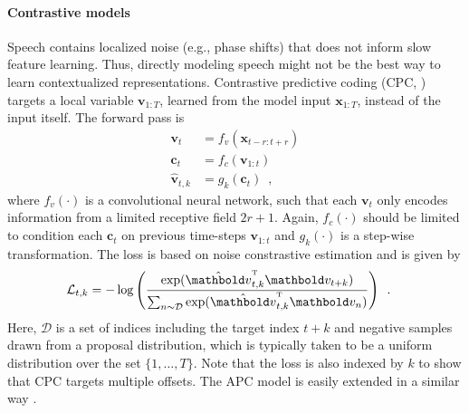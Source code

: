 \paragraph{Contrastive models} Speech contains localized noise (e.g., phase shifts) that does not inform slow feature learning. Thus, directly modeling speech might not be the best way to learn contextualized representations. Contrastive predictive coding (CPC,  \citealp{oord2018representation}) targets a local variable $\mathbf{v}_{1:T}$, learned from the model input $\mathbf{x}_{1:T}$, instead of the input itself. The forward pass is
%
\begin{align}
    \mathbf{v}_{t} &= f_{v}(\mathbf{x}_{t-r:t+r}) \label{eq: cpc local representation} \\
    \mathbf{c}_{t} &= f_{c}(\mathbf{v}_{1:t}) \\
    \hat{\mathbf{v}}_{t,k} &= g_k(\mathbf{c}_{t}) \enspace,
\end{align}
%
\noindent where $f_v(\cdot)$ is a convolutional neural network, such that each $\mathbf{v}_{t}$ only encodes information from a limited receptive field $2r+1$. Again, $f_c(\cdot)$ should be limited to condition each $\mathbf{c}_t$ on previous time-steps $\mathbf{v}_{1:t}$ and $g_k(\cdot)$ is a step-wise transformation. The loss is based on noise constrastive estimation \cite{gutmann2010noise} and is given by
\begin{align}
    \mathcal{L}_{t,k} &= - \log \left(\frac{\exp(\hat{\mathbf{v}}_{t,k}^{\text{\tiny T}}\mathbf{v}_{t+k})}{\sum_{n \sim \mathcal{D}} \exp(\hat{\mathbf{v}}_{t,k}^{\text{\tiny T}}\mathbf{v}_{n})} \right)\enspace .
    \label{eq: cpc loss}
\end{align}
%
\noindent Here, $\mathcal{D}$ is a set of indices including the target index $t+k$ and negative samples drawn from a proposal distribution, which is typically taken to be a uniform distribution over the set $\{1,\dots,T\}$. Note that the loss is also indexed by $k$ to show that CPC targets multiple offsets. The APC model is easily extended in a similar way \cite{chung2020improved}.

